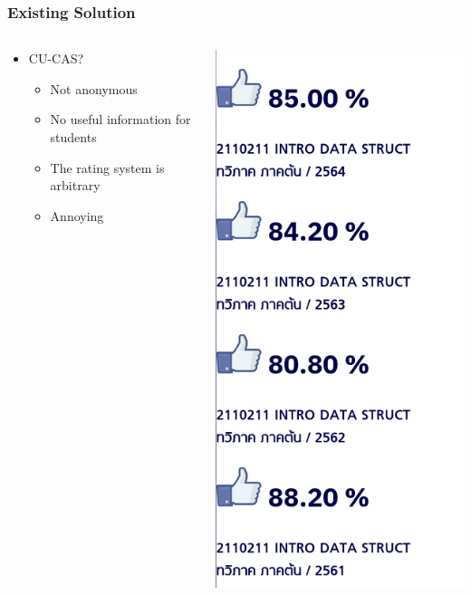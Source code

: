 \documentclass[aspectratio=169]{beamer}
\begin{document}
\begin{frame}
    \frametitle{Existing Solution}
    \begin{columns}
        \begin{column}{0.3\textwidth}
            \begin{itemize}
                \item CU-CAS?
                      \begin{itemize}
                          \item {\color{red}Not anonymous}
                          \item {No useful information for students}
                          \item {The rating system is arbitrary}
                          \item Annoying 
                      \end{itemize}
            \end{itemize}
        \end{column}
        \begin{column}{0.3\textwidth}
            \centering
            \includegraphics[scale=0.3]{cucas_score.png}

\end{column}
\end{columns}
\end{frame}
\end{document}
